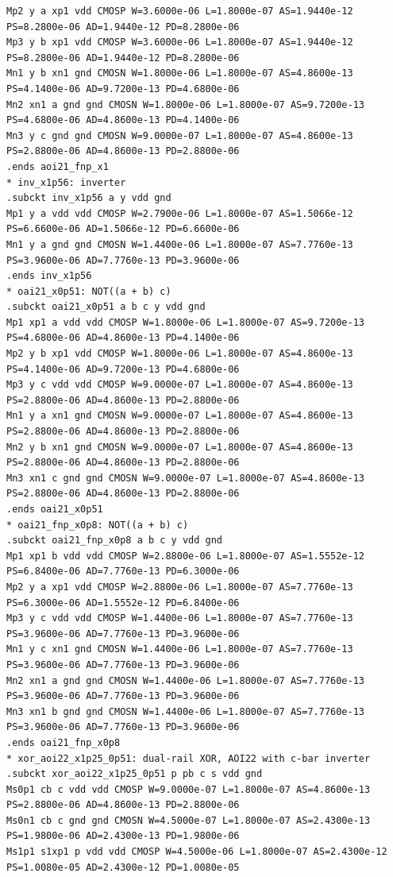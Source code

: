 \documentclass[10pt,a4paper]{article}
\begin{document}
{\begin{verbatim}
Mp2 y a xp1 vdd CMOSP W=3.6000e-06 L=1.8000e-07 AS=1.9440e-12 PS=8.2800e-06 AD=1.9440e-12 PD=8.2800e-06
Mp3 y b xp1 vdd CMOSP W=3.6000e-06 L=1.8000e-07 AS=1.9440e-12 PS=8.2800e-06 AD=1.9440e-12 PD=8.2800e-06
Mn1 y b xn1 gnd CMOSN W=1.8000e-06 L=1.8000e-07 AS=4.8600e-13 PS=4.1400e-06 AD=9.7200e-13 PD=4.6800e-06
Mn2 xn1 a gnd gnd CMOSN W=1.8000e-06 L=1.8000e-07 AS=9.7200e-13 PS=4.6800e-06 AD=4.8600e-13 PD=4.1400e-06
Mn3 y c gnd gnd CMOSN W=9.0000e-07 L=1.8000e-07 AS=4.8600e-13 PS=2.8800e-06 AD=4.8600e-13 PD=2.8800e-06
.ends aoi21_fnp_x1
* inv_x1p56: inverter
.subckt inv_x1p56 a y vdd gnd
Mp1 y a vdd vdd CMOSP W=2.7900e-06 L=1.8000e-07 AS=1.5066e-12 PS=6.6600e-06 AD=1.5066e-12 PD=6.6600e-06
Mn1 y a gnd gnd CMOSN W=1.4400e-06 L=1.8000e-07 AS=7.7760e-13 PS=3.9600e-06 AD=7.7760e-13 PD=3.9600e-06
.ends inv_x1p56
* oai21_x0p51: NOT((a + b) c)
.subckt oai21_x0p51 a b c y vdd gnd
Mp1 xp1 a vdd vdd CMOSP W=1.8000e-06 L=1.8000e-07 AS=9.7200e-13 PS=4.6800e-06 AD=4.8600e-13 PD=4.1400e-06
Mp2 y b xp1 vdd CMOSP W=1.8000e-06 L=1.8000e-07 AS=4.8600e-13 PS=4.1400e-06 AD=9.7200e-13 PD=4.6800e-06
Mp3 y c vdd vdd CMOSP W=9.0000e-07 L=1.8000e-07 AS=4.8600e-13 PS=2.8800e-06 AD=4.8600e-13 PD=2.8800e-06
Mn1 y a xn1 gnd CMOSN W=9.0000e-07 L=1.8000e-07 AS=4.8600e-13 PS=2.8800e-06 AD=4.8600e-13 PD=2.8800e-06
Mn2 y b xn1 gnd CMOSN W=9.0000e-07 L=1.8000e-07 AS=4.8600e-13 PS=2.8800e-06 AD=4.8600e-13 PD=2.8800e-06
Mn3 xn1 c gnd gnd CMOSN W=9.0000e-07 L=1.8000e-07 AS=4.8600e-13 PS=2.8800e-06 AD=4.8600e-13 PD=2.8800e-06
.ends oai21_x0p51
* oai21_fnp_x0p8: NOT((a + b) c)
.subckt oai21_fnp_x0p8 a b c y vdd gnd
Mp1 xp1 b vdd vdd CMOSP W=2.8800e-06 L=1.8000e-07 AS=1.5552e-12 PS=6.8400e-06 AD=7.7760e-13 PD=6.3000e-06
Mp2 y a xp1 vdd CMOSP W=2.8800e-06 L=1.8000e-07 AS=7.7760e-13 PS=6.3000e-06 AD=1.5552e-12 PD=6.8400e-06
Mp3 y c vdd vdd CMOSP W=1.4400e-06 L=1.8000e-07 AS=7.7760e-13 PS=3.9600e-06 AD=7.7760e-13 PD=3.9600e-06
Mn1 y c xn1 gnd CMOSN W=1.4400e-06 L=1.8000e-07 AS=7.7760e-13 PS=3.9600e-06 AD=7.7760e-13 PD=3.9600e-06
Mn2 xn1 a gnd gnd CMOSN W=1.4400e-06 L=1.8000e-07 AS=7.7760e-13 PS=3.9600e-06 AD=7.7760e-13 PD=3.9600e-06
Mn3 xn1 b gnd gnd CMOSN W=1.4400e-06 L=1.8000e-07 AS=7.7760e-13 PS=3.9600e-06 AD=7.7760e-13 PD=3.9600e-06
.ends oai21_fnp_x0p8
* xor_aoi22_x1p25_0p51: dual-rail XOR, AOI22 with c-bar inverter
.subckt xor_aoi22_x1p25_0p51 p pb c s vdd gnd
Ms0p1 cb c vdd vdd CMOSP W=9.0000e-07 L=1.8000e-07 AS=4.8600e-13 PS=2.8800e-06 AD=4.8600e-13 PD=2.8800e-06
Ms0n1 cb c gnd gnd CMOSN W=4.5000e-07 L=1.8000e-07 AS=2.4300e-13 PS=1.9800e-06 AD=2.4300e-13 PD=1.9800e-06
Ms1p1 s1xp1 p vdd vdd CMOSP W=4.5000e-06 L=1.8000e-07 AS=2.4300e-12 PS=1.0080e-05 AD=2.4300e-12 PD=1.0080e-05

\end{verbatim}}
\end{document}
